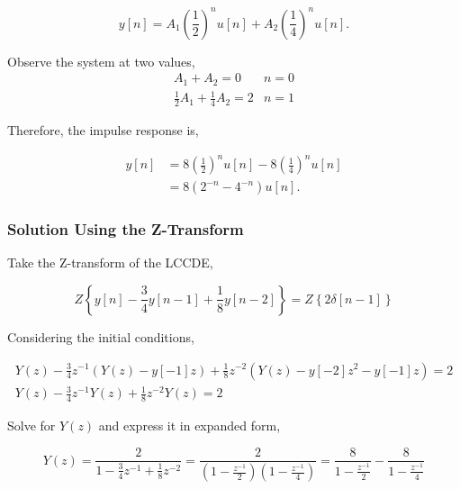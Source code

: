\begin{equation}
    y[n] = A_1 \left(\frac{1}{2} \right)^n u[n] + A_2 \left( \frac{1}{4} \right)^n u[n].
\end{equation}

Observe the system at two values,
\begin{equation}
    \begin{array}{*{20}{c}}
        {{A_1} + {A_2} = 0}&{n = 0}\\
        {\frac{1}{2}{A_1} + \frac{1}{4}{A_2} = 2}&{n = 1}
        \end{array}
\end{equation}

Therefore, the impulse response is,

\begin{equation}
    \begin{aligned}
    y[n] &= 8 \left(\frac{1}{2} \right)^n u[n] -8 \left( \frac{1}{4} \right)^n u[n] \\
    &= 8 \left( 2^{-n} - 4^{-n} \right) u[n].
    \end{aligned}
\end{equation}

\subsubsection{Solution Using the Z-Transform}

Take the Z-transform of the LCCDE,

\begin{equation}
Z\left\{ {y[n] - \frac{3}{4}y[n - 1] + \frac{1}{8}y[n - 2]} \right\} = Z\left\{ {2\delta [n - 1]} \right\}
\end{equation}

Considering the initial conditions,

\begin{equation}
    \begin{aligned}
        Y(z) - \frac{3}{4}{z^{ - 1}}\left( {Y(z) - y[ - 1]z} \right) + \frac{1}{8}{z^{ - 2}}\left( {Y(z) - y[ - 2]{z^2} - y[ - 1]z} \right) = 2\\
        Y(z) - \frac{3}{4}{z^{ - 1}}Y(z) + \frac{1}{8}{z^{ - 2}}Y(z) = 2
        \end{aligned}
\end{equation}

Solve for $Y(z)$ and express it in expanded form,

\begin{equation}
    Y(z) = \frac{2}{{1 - \frac{3}{4}{z^{ - 1}} + \frac{1}{8}{z^{ - 2}}}} = \frac{2}{{\left( {1 - \frac{{{z^{ - 1}}}}{2}} \right)\left( {1 - \frac{{{z^{ - 1}}}}{4}} \right)}} = \frac{8}{{1 - \frac{{{z^{ - 1}}}}{2}}} - \frac{8}{{1 - \frac{{{z^{ - 1}}}}{4}}}
\end{equation}

